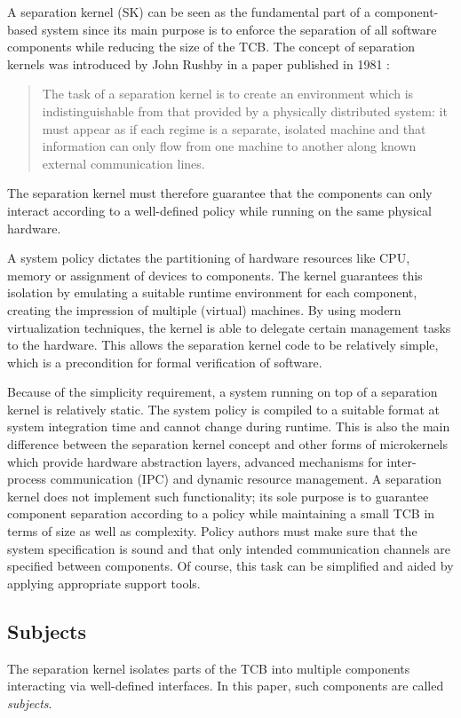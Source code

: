 A separation kernel (SK) can be seen as the
fundamental part of a component-based system since its main purpose is to
enforce the separation of all software components while reducing the size of
the TCB. The concept of separation kernels was introduced by John Rushby in a
paper published in 1981 \cite{rushby1981}:

\begin{quote}
The task of a separation kernel is to create an environment which is
indistinguishable from that provided by a physically distributed system: it
must appear as if each regime is a separate, isolated machine and that
information can only flow from one machine to another along known external
communication lines.
\end{quote}

The separation kernel must therefore guarantee that the components can only
interact according to a well-defined policy while running on the
same physical hardware.

A system policy dictates the partitioning of hardware resources like
CPU, memory or assignment of devices to components. The kernel
guarantees this isolation by emulating a suitable runtime environment for each
component, creating the impression of multiple (virtual) machines. By using
modern virtualization techniques, the kernel is able to delegate certain
management tasks to the hardware. This allows the separation kernel code to be
relatively simple, which is a precondition for formal verification of software.

Because of the simplicity requirement, a system running on top of a separation
kernel is relatively static. The system policy is compiled to a suitable format
at system integration time and cannot change during runtime. This is also the
main difference between the separation kernel concept and other forms of
microkernels which provide hardware abstraction layers, advanced mechanisms for
inter-process communication (IPC) and dynamic resource management. A
separation kernel does not implement such functionality; its sole purpose is to
guarantee component separation according to a policy while maintaining a small
TCB in terms of size as well as complexity. Policy authors must make sure that
the system specification is sound and that only intended communication channels
are specified between components. Of course, this task can be simplified and
aided by applying appropriate support tools.

\subsection{Subjects}
The separation kernel isolates parts of the TCB into multiple
components interacting via well-defined interfaces. In this
paper, such components are called \emph{subjects}.

